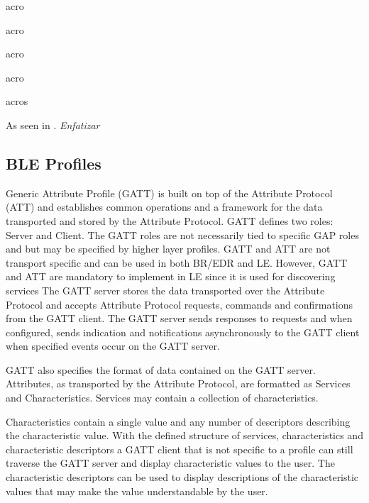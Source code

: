 \ac{acro} 

\acf{acro}

\acs{acro}

\acl{acro}

\acp{acro}

As seen in \cite{wiki}. \emph{Enfatizar}


\subsection{\ac{BLE} Profiles}
\label{subsec:BLEProfile}

Generic Attribute Profile (GATT) is built on top of the Attribute Protocol (ATT)
and establishes common operations and a framework for the data transported
and stored by the Attribute Protocol. GATT defines two roles: Server and
Client. The GATT roles are not necessarily tied to specific GAP roles and but
may be specified by higher layer profiles. GATT and ATT are not transport
specific and can be used in both BR/EDR and LE. However, GATT and ATT
are mandatory to implement in LE since it is used for discovering services
The GATT server stores the data transported over the Attribute Protocol and
accepts Attribute Protocol requests, commands and confirmations from the
GATT client. The GATT server sends responses to requests and when
configured, sends indication and notifications asynchronously to the GATT
client when specified events occur on the GATT server.



GATT also specifies the format of data contained on the GATT server.
Attributes, as transported by the Attribute Protocol, are formatted as Services
and Characteristics. Services may contain a collection of characteristics.

Characteristics contain a single value and any number of descriptors
describing the characteristic value.
With the defined structure of services, characteristics and characteristic
descriptors a GATT client that is not specific to a profile can still traverse the
GATT server and display characteristic values to the user. The characteristic
descriptors can be used to display descriptions of the characteristic values that
may make the value understandable by the user.

